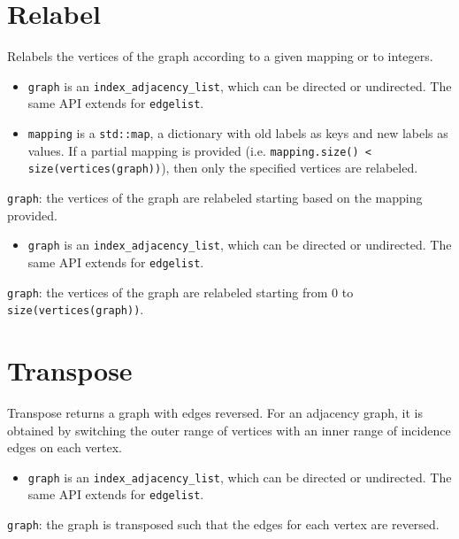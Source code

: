 \section{Relabel}
Relabels the vertices of the graph according to a given mapping or to integers.

{\small
      
}
\begin{itemdescr}
    \pnum\preconditions
    \begin{itemize}
          \item
                \lstinline{graph} is an \lstinline{index_adjacency_list}, which can be directed or undirected. The same API extends for \lstinline{edgelist}.
            \item
                \lstinline{mapping} is a \lstinline{std::map}, a dictionary with old labels as keys and new labels as values. If a partial mapping is provided (i.e. \lstinline{mapping.size() < size(vertices(graph))}), then only the specified vertices are relabeled.
    \end{itemize}
    \pnum\effects \lstinline{graph}: the vertices of the graph are relabeled starting based on the mapping provided.
\end{itemdescr}

{\small
      
}
\begin{itemdescr}
    \pnum\preconditions
    \begin{itemize}
          \item
                \lstinline{graph} is an \lstinline{index_adjacency_list}, which can be directed or undirected. The same API extends for \lstinline{edgelist}.
    \end{itemize}
    \pnum\effects \lstinline{graph}: the vertices of the graph are relabeled starting from 0 to \lstinline{size(vertices(graph))}.
\end{itemdescr}

\section{Transpose}
Transpose returns a graph with edges reversed. For an adjacency graph, it is obtained by switching the outer range of vertices with an inner range of incidence edges on each vertex.

{\small
      
}
\begin{itemdescr}
    \pnum\preconditions
    \begin{itemize}
          \item
                \lstinline{graph} is an \lstinline{index_adjacency_list}, which can be directed or undirected. The same API extends for \lstinline{edgelist}.
    \end{itemize}
    \pnum\effects \lstinline{graph}: the graph is transposed such that the edges for each vertex are reversed.
\end{itemdescr}


